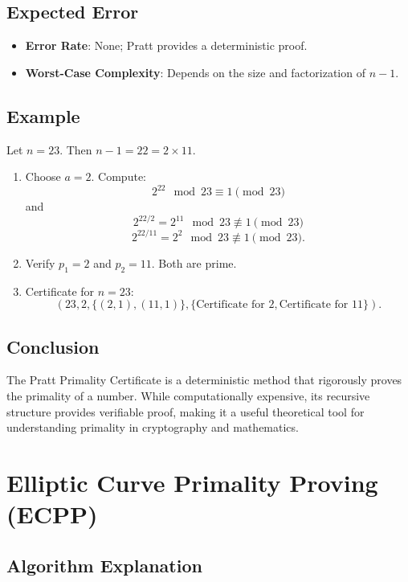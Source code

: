 \documentclass[12pt]{article}
\begin{document}
\subsection*{Expected Error}

\begin{itemize}
    \item \textbf{Error Rate}: None; Pratt provides a deterministic proof.
    \item \textbf{Worst-Case Complexity}: Depends on the size and factorization of \( n-1 \).
\end{itemize}

\subsection*{Example}

Let \( n = 23 \). Then \( n-1 = 22 = 2 \times 11 \). 

\begin{enumerate}
    \item Choose \( a = 2 \). Compute:
    \[
    2^{22} \mod 23 \equiv 1 \pmod{23}
    \]
    and
    \[
    2^{22/2} = 2^{11} \mod 23 \not\equiv 1 \pmod{23}
    \]
    \[
    2^{22/11} = 2^2 \mod 23 \not\equiv 1 \pmod{23}.
    \]
    \item Verify \( p_1 = 2 \) and \( p_2 = 11 \). Both are prime.
    \item Certificate for \( n = 23 \):
    \[
    (23, 2, \{(2, 1), (11, 1)\}, \{\text{Certificate for 2}, \text{Certificate for 11}\}).
    \]
\end{enumerate}

\subsection*{Conclusion}

The Pratt Primality Certificate is a deterministic method that rigorously proves the primality of a number. While computationally expensive, its recursive structure provides verifiable proof, making it a useful theoretical tool for understanding primality in cryptography and mathematics.

\section{Elliptic Curve Primality Proving (ECPP)}

\subsection*{Algorithm Explanation}
\end{document}
